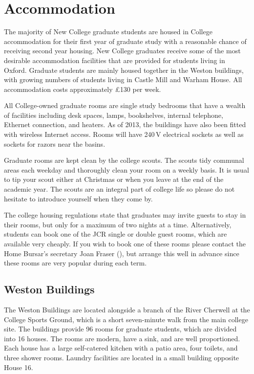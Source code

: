 
\chapter{Accommodation}

The majority of New College graduate students are housed in College accommodation for their first year of graduate study with a reasonable chance of receiving second year housing. New College graduates receive some of the most desirable accommodation facilities that are provided for students living in Oxford. Graduate students are mainly housed together in the Weston buildings, with growing numbers of students living in Castle Mill and Warham House. All accommodation costs approximately \pounds130 per week.

All College-owned graduate rooms are single study bedrooms that have a wealth of facilities including desk spaces, lamps, bookshelves, internal telephone, Ethernet connection, and heaters. As of 2013, the buildings have also been fitted with wireless Internet access.  Rooms will have 240\,V electrical sockets as well as sockets for razors near the basins.

Graduate rooms are kept clean by the college scouts. The scouts tidy communal areas each weekday and thoroughly clean your room on a weekly basis. It is usual to tip your scout either at Christmas or when you leave at the end of the academic year. The scouts are an integral part of college life so please do not hesitate to introduce yourself when they come by. 

The college housing regulations state that graduates may invite guests to stay in their rooms, but only for a maximum of two nights at a time. Alternatively, students can book one of the JCR single or double guest rooms, which are available very cheaply. If you wish to book one of these rooms please contact the Home Bursar's secretary Joan Fraser (\href{mailto:joan.fraser@new.ox.ac.uk}{}), but arrange this well in advance since these rooms are very popular during each term.

\section{Weston Buildings}

The Weston Buildings are located alongside a branch of the River Cherwell at the 
College Sports Ground, which is a short seven-minute walk from the main college site. The buildings provide 96 rooms for graduate students, which are divided into 16 houses. The rooms are modern, have a sink, and are well proportioned. Each house has a large self-catered kitchen with a patio area, four toilets, and three shower rooms. Laundry facilities are located in a small building opposite House 16.

